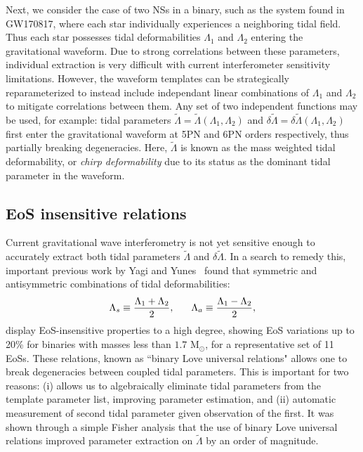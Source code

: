 \documentclass[prd,twocolumn,nofootinbib,superscriptaddress,amsmath,amssymb]{revtex4-1}
\begin{document}
Next, we consider the case of two NSs in a binary, such as the system found in GW170817, where each star 
individually experiences a neighboring tidal field.
Thus each star possesses tidal deformabilities $\Lambda_1$ and $\Lambda_2$ entering the gravitational waveform.
Due to strong correlations between these parameters, individual extraction is very difficult with current interferometer sensitivity limitations.
However, the waveform templates can be strategically reparameterized to instead include independant linear combinations of $\Lambda_1$ and $\Lambda_2$ to mitigate correlations between them. 
Any set of two independent functions may be used, for example: tidal parameters $\tilde{\Lambda}=\tilde{\Lambda}(\Lambda_1,\Lambda_2)$ and $\delta \tilde{\Lambda}=\delta \tilde{\Lambda}(\Lambda_1,\Lambda_2)$~\cite{Wade:tidalCorrections} first enter the gravitational waveform at 5PN and 6PN orders respectively, thus partially breaking degeneracies.
Here, $\tilde{\Lambda}$ is known as the mass weighted tidal deformability, or \emph{chirp deformability} due to its status as the dominant tidal parameter in the waveform. 

\subsection{EoS insensitive relations}\label{sec:eosInsensitive}
Current gravitational wave interferometry is not yet sensitive enough to accurately extract both tidal parameters $\tilde{\Lambda}$ and $\delta\tilde{\Lambda}$.
In a search to remedy this, important previous work by Yagi and Yunes~\cite{Yagi:binLove} found that symmetric and antisymmetric combinations of tidal deformabilities:
\begin{equation}
\Lambda_s \equiv \frac{\Lambda_1 + \Lambda_2}{2}, \hspace{6mm} \Lambda_a \equiv \frac{\Lambda_1 - \Lambda_2}{2},
\end{equation}
display EoS-insensitive properties to a high degree, showing EoS variations up to 20\% for binaries with masses less than $1.7 \text{ M}_{\odot}$, for a representative set of 11 EoSs. 
These relations, known as ``binary Love universal relations" allows one to break degeneracies between coupled tidal parameters.
This is important for two reasons: (i) allows us to algebraically eliminate tidal parameters from the template parameter list, improving parameter estimation, and (ii) automatic measurement of second tidal parameter given observation of the first.
It was shown through a simple Fisher analysis that the use of binary Love universal relations improved parameter extraction on $\tilde{\Lambda}$ by an order of magnitude.
\end{document}
